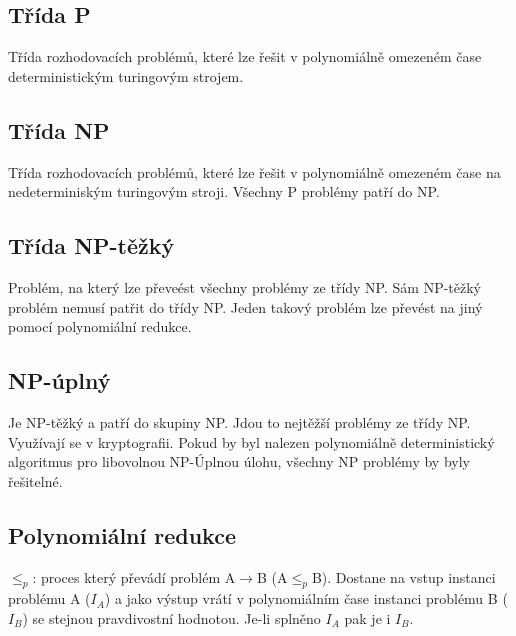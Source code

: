 \documentclass{../../szzclass}
\begin{document}
\subsection{Třída P}
Třída rozhodovacích problémů, které lze řešit v polynomiálně omezeném čase deterministickým turingovým strojem.
\subsection{Třída NP}
Třída rozhodovacích problémů, které lze řešit v polynomiálně omezeném čase na nedeterminiským turingovým stroji.
Všechny P problémy patří do NP.
\subsection{Třída NP-těžký}
Problém, na který lze převeést všechny problémy ze třídy NP. Sám NP-těžký problém nemusí patřit do třídy NP.
Jeden takový problém lze převést na jiný pomocí polynomiální redukce.
\subsection{NP-úplný}
Je NP-těžký a patří do skupiny NP. Jdou to nejtěžší problémy ze třídy NP. Využívají se v kryptografii.
\newline
Pokud by byl nalezen polynomiálně deterministický algoritmus pro libovolnou NP-Úplnou úlohu, všechny NP problémy by byly řešitelné.
\subsection{Polynomiální redukce}
$\leq_p$: proces který převádí problém A$\rightarrow$B (A$\leq_p$B). Dostane na vstup instanci problému A ($I_A$) a jako výstup vrátí v polynomiálním čase instanci problému B ($I_B$)
se stejnou pravdivostní hodnotou. Je-li splněno $I_A$ pak je i $I_B$. 
\end{document}

